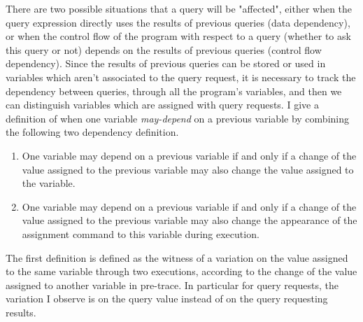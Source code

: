  There are two possible situations that a query will be "affected",  
 either when the query expression directly uses the results of previous queries (data dependency), or when the control flow of the program with respect to a query (whether to ask this query or not) 
 depends on the results of previous queries (control flow dependency).
 Since the results of previous queries can be stored or used in variables
 which aren't associated to the query request,
 it is necessary to track the dependency between queries, through all the program's variables,  
 and then we can distinguish variables which are assigned with query requests.
  I give a definition of when one variable \emph{may-depend} on a previous variable by combining the following
  two dependency definition.
 {
 \begin{enumerate}
     \item One variable may depend on a previous variable if and only if a change of the value assigned to the previous variable may also change the value assigned to the variable.
     \item One variable may depend on a previous variable if and only if a change of the value assigned to the previous variable may also change the appearance of the assignment command to this variable 
     during execution.
 \end{enumerate}
 }
 The first definition is defined as
 the witness of a variation on the value assigned to the same variable through two executions,
 according to the change of the value assigned to another variable in pre-trace.
 In particular for query requests, the variation I observe is on the query value instead of on the query requesting results.

